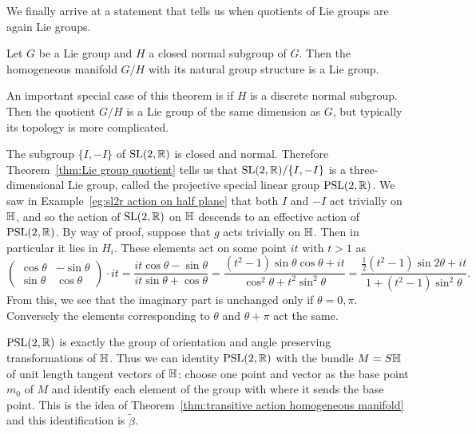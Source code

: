 We finally arrive at a statement that tells us when quotients of Lie groups are again Lie groups.

\begin{theorem}
\label{thm:Lie group quotient}
Let $G$ be a Lie group and $H$ a closed normal subgroup of $G$. Then the homogeneous manifold $G/H$ with its natural group structure is a Lie group.
\end{theorem}

An important special case of this theorem is if $H$ is a discrete normal subgroup.
Then the quotient $G/H$ is a Lie group of the same dimension as $G$, but typically its topology is more complicated.

\begin{example}
\label{eg:psl2r}
The subgroup $\{I,-I\}$ of $\mathrm{SL}(2,\mathbb{R})$ is closed and normal.
Therefore Theorem~\ref{thm:Lie group quotient} tells us that $\mathrm{SL}(2,\mathbb{R})/ \{I,-I\}$ is a three-dimensional Lie group, called the projective special linear group $\mathrm{PSL}(2,\mathbb{R})$.
We saw in Example~\ref{eg:sl2r action on half plane} that both $I$ and $-I$ act trivially on $\mathbb{H}$, and so the action of $\mathrm{SL}(2,\mathbb{R})$ on $\mathbb{H}$ descends to an effective action of $\mathrm{PSL}(2,\mathbb{R})$.
By way of proof, suppose that $g$ acts trivially on $\mathbb{H}$.
Then in particular it lies in $H_i$.
These elements act on some point $it$ with $t>1$ as 
\[
\begin{pmatrix}
\cos\theta & -\sin\theta \\ \sin\theta & \cos\theta
\end{pmatrix} \cdot it
= \frac{it \cos\theta - \sin\theta}{it \sin\theta + \cos\theta}
= \frac{(t^2-1) \sin\theta\cos\theta + it}{\cos^2\theta + t^2 \sin^2\theta}
= \frac{\tfrac{1}{2}(t^2-1) \sin2\theta + it}{1 + (t^2-1) \sin^2\theta}.
\]
From this, we see that the imaginary part is unchanged only if $\theta = 0,\pi$.
Conversely the elements corresponding to $\theta$ and $\theta + \pi$ act the same. 

$\mathrm{PSL}(2,\mathbb{R})$ is exactly the group of orientation and angle preserving transformations of $\mathbb{H}$.
Thus we can identity $\mathrm{PSL}(2,\mathbb{R})$ with the bundle $M = S\mathbb{H}$ of unit length tangent vectors of $\mathbb{H}$: choose one point and vector as the base point $m_0$ of $M$ and identify each element of the group with where it sends the base point.
This is the idea of Theorem~\ref{thm:transitive action homogeneous manifold} and this identification is $\tilde{\beta}$.
\end{example}

